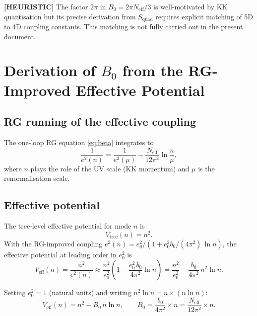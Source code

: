 \documentclass[11pt,a4paper]{article}
\newcommand{\heuristic}[1]{\textbf{[HEURISTIC]} #1}
\begin{document}
\heuristic{The factor $2\pi$ in $B_0 = 2\pi N_\mathrm{eff}/3$ is well-motivated
by KK quantisation but its precise derivation from $S_\mathrm{quad}$ requires
explicit matching of 5D to 4D coupling constants.  This matching is not fully
carried out in the present document.}

\section{Derivation of $B_0$ from the RG-Improved Effective Potential}

\subsection{RG running of the effective coupling}

The one-loop RG equation \eqref{eq:beta} integrates to
\begin{equation}
  \label{eq:e2_running}
  \frac{1}{e^2(n)} = \frac{1}{e^2(\mu)}
  - \frac{N_\mathrm{eff}}{12\pi^2}\ln\frac{n}{\mu},
\end{equation}
where $n$ plays the role of the UV scale (KK momentum) and $\mu$ is the
renormalisation scale.

\subsection{Effective potential}

The tree-level effective potential for mode $n$ is
\[
  V_\mathrm{tree}(n) = n^2.
\]
With the RG-improved coupling $e^2(n) = e^2_0/(1 + e^2_0 b_0/(4\pi^2)\,\ln n)$,
the effective potential at leading order in $e^2_0$ is
\begin{equation}
  \label{eq:V_eff_RG}
  V_\mathrm{eff}(n)
  = \frac{n^2}{e^2(n)}
  \approx \frac{n^2}{e^2_0}
    \left(1 - \frac{e^2_0\,b_0}{4\pi^2}\ln n\right)
  = \frac{n^2}{e^2_0} - \frac{b_0}{4\pi^2}\,n^2\ln n.
\end{equation}

Setting $e^2_0 = 1$ (natural units) and writing $n^2\ln n = n \times (n\ln n)$:
\begin{equation}
  \label{eq:V_eff_B}
  V_\mathrm{eff}(n) = n^2 - B_0\,n\ln n,
  \qquad
  B_0 = \frac{b_0}{4\pi^2}\times n = \frac{N_\mathrm{eff}}{12\pi^2}\times n.
\end{equation}
\end{document}
